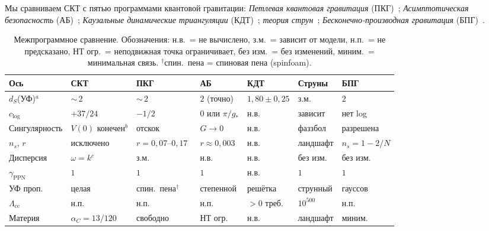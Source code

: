 \documentclass[12pt,a4paper]{article}
\theoremstyle{plain}
\theoremstyle{definition}
\theoremstyle{remark}
\begin{document}
Мы сравниваем СКТ с пятью программами квантовой гравитации:
\emph{Петлевая квантовая гравитация}
(ПКГ)~\cite{Rovelli:2004,Thiemann:2007};
\emph{Асимптотическая безопасность}
(АБ)~\cite{ReuterSaueressig:2012};
\emph{Каузальные динамические триангуляции}
(КДТ)~\cite{AJL:2012};
\emph{теория струн}~\cite{Polchinski:1998};
\emph{Бесконечно-производная гравитация}
(БПГ)~\cite{BMS:2006,Modesto:2012}.

\begin{table}[ht]
\centering
\caption{Межпрограммное сравнение. Обозначения: н.в.\ = не вычислено, з.м.\ = зависит от модели,
н.п.\ = не предсказано, НТ огр.\ = неподвижная точка
ограничивает, без изм.\ = без изменений, миним.\ = минимальная
связь. ${}^{\dagger}$спин.\ пена = спиновая пена (spinfoam).}
\label{tab:comparison}
\footnotesize
\setlength{\tabcolsep}{3pt}
\begin{tabular}{p{2.2cm}p{2.0cm}p{1.8cm}p{2.0cm}p{1.5cm}p{1.8cm}p{1.8cm}}
\toprule
Ось & СКТ & ПКГ & АБ & КДТ & Струны & БПГ \\
\midrule
$d_S$(УФ)${}^a$ &
  ${\sim}\,2$ &
  ${\sim}\,2$ &
  $2$ (точно) &
  $1{,}80\pm0{,}25$ &
  з.м. &
  $2$ \\[4pt]
$c_{\log}$ &
  $+37/24$ &
  $-1/2$ &
  $0$ или $\pi/g_*$ &
  н.в. &
  зависит &
  нет log \\[4pt]
Сингулярность &
  $V(0)$ конечен${}^b$ &
  отскок &
  $G \to 0$ &
  н.в. &
  фаззбол &
  разрешена \\[4pt]
$n_s$, $r$ &
  исключено &
  $r = 0{,}07$--$0{,}17$~\cite{AguloMorris:2015} &
  $r \approx 0{,}003$ &
  н.в. &
  ландшафт &
  $n_s = 1-2/N$ \\[4pt]
Дисперсия &
  $\omega = k$${}^c$ &
  з.м. &
  н.в. &
  н.в. &
  без изм. &
  без изм. \\[4pt]
$\gamma_{\text{PPN}}$ &
  $1$ &
  $1$ &
  $1$ &
  н.в. &
  $1$ &
  $1$ \\[4pt]
УФ проп. &
  целая &
  спин.\ пена${}^{\dagger}$ &
  степенной &
  решётка &
  струнный &
  гауссов \\[4pt]
$\Lambda_{\text{cc}}$ &
  н.п. &
  н.п. &
  н.п. &
  $>0$ треб. &
  $10^{500}$ &
  н.п. \\[4pt]
Материя &
  $\alpha_C = 13/120$ &
  свободно &
  НТ огр. &
  н.в. &
  ландшафт &
  миним. \\
\bottomrule
\end{tabular}

\smallskip{}
\end{table}
\end{document}
